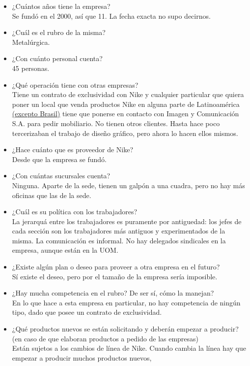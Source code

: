 \documentclass[a4paper,10pt,titlepage]{article}
\begin{document}
\begin{itemize}
\item ¿Cu\'antos a\~nos tiene la empresa? \\
Se fund\'o en el 2000, as\'i que 11. La fecha exacta no supo decirnos.
\item ¿Cu\'al es el rubro de la misma? \\
Metal\'urgica.
\item ¿Con cu\'anto personal cuenta? \\
45 personas.
\item ¿Qu\'e operaci\'on tiene con otras empresas? \\
Tiene un contrato de exclusividad con Nike y cualquier particular que quiera poner un local que venda productos Nike 
en alguna parte de Latinoam\'erica \underline{(excepto Brasil)} tiene que ponerse en contacto con Imagen y Comunicación S.A. 
para pedir mobiliario. No tienen otros clientes. Hasta hace poco tercerizaban el trabajo de diseño gr\'afico, pero ahora lo hacen ellos mismos.
\item ¿Hace cu\'anto que es proveedor de Nike? \\
Desde que la empresa se fund\'o.
\item ¿Con cu\'antas sucursales cuenta? \\
Ninguna. Aparte de la sede, tienen un galp\'on a una cuadra, pero no hay m\'as oficinas que las de la sede.
\item ¿Cu\'al es su pol\'itica con los trabajadores? \\
La jerarqu\'a entre los trabajadores es puramente por antiguedad: los jefes de cada secci\'on son los trabajadores m\'as antiguos
 y experimentados de la misma. La comunicaci\'on es informal. No hay delegados sindicales en la empresa, aunque est\'an en la UOM.
\item ¿Existe alg\'un plan o deseo para proveer a otra empresa en el futuro? \\
S\'i existe el deseo, pero por el tamaño de la empresa ser\'ia imposible.
\item ¿Hay mucha competencia en el rubro? De ser s\'i, c\'omo la manejan? \\
En lo que hace a esta empresa en particular, no hay competencia de ning\'un tipo, dado que posee un contrato de exclusividad.
\item ¿Qu\'e productos nuevos se est\'an solicitando y deber\'an empezar a producir? (en caso de que elaboran productos a pedido de las empresas) \\
Est\'an sujetos a los cambios de l\'inea de Nike. Cuando cambia la l\'inea hay que empezar a producir muchos productos nuevos,

\end{itemize}
\end{document}
